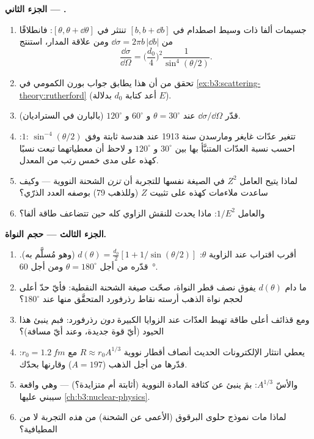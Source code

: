 \begin{problem}
\medskip\noindent\textbf{الجزء الثاني --- .}
\begin{enumerate}[resume]
  \item جسيمات ألفا ذات وسيط اصطدام في $[b, b + \dd b]$ تنتثر
        في $[\theta, \theta + \dd\theta]$: فانطلاقًا من $\dd\sigma =
        2\pi b\,|\dd b|$ ومن علاقة المدار، استنتج
        \[
        \frac{\dd\sigma}{\dd\Omega} =
        \Big(\frac{d_0}{4}\Big)^2\frac{1}{\sin^4(\theta/2)} .
        \]
  \item تحقق من أن هذا يطابق جواب بورن الكمومي في
        \cref{ex:b3:scattering-theory:rutherford} (أعد كتابة $d_0$
        بدلالة $E$).
  \item قدّر $\dd\sigma/\dd\Omega$ عند $\theta = 30^\circ$ و
        $60^\circ$ و $120^\circ$ (بالبارن في الستراديان).
  \item تتغير عدّات غايغر ومارسدن سنة 1913 عند هندسة ثابتة
        وفق $1{:}\,\sin^{-4}(\theta/2)$: احسب نسبة العدّات
        المتنبَّأ بها بين $30^\circ$ و $120^\circ$ و
        لاحظ أن معطياتهما تبعت نسبًا كهذه على مدى خمس رتب
        من المعدل.
  \item لماذا يتيح العامل $Z^2$ في الصيغة نفسها للتجربة أن
        \emph{تزن} الشحنة النووية --- وكيف ساعدت ملاءمات كهذه
        على تثبيت $Z$ (وللذهب 79) بوصفه العدد الذرّي؟
  \item والعامل $1/E^2$: ماذا يحدث للنقش الزاوي كله
        حين تتضاعف طاقة ألفا؟
\end{enumerate}

\medskip\noindent\textbf{الجزء الثالث --- حجم النواة.}
\begin{enumerate}[resume]
  \item أقرب اقتراب عند الزاوية $\theta$: $d(\theta) =
        \tfrac{d_0}2[1 + 1/\sin(\theta/2)]$ (وهو مُسلَّم به). قدّره
        من أجل $\theta = 180^\circ$ ومن أجل \qty{60}{\degree}.
  \item ما دام $d(\theta)$ يفوق نصف قطر النواة، صحّت
        صيغة الشحنة النقطية: فأيّ حدّ أعلى لحجم نواة
        الذهب أرسته نقاط رذرفورد المتحقَّق منها عند $180^\circ$؟
  \item ومع قذائف أعلى طاقة تهبط العدّات عند الزوايا الكبيرة
        \emph{دون} رذرفورد: فبم ينبئ هذا الحيود
        (أيّ قوة جديدة، وعند أيّ مسافة)؟
  \item يعطي انتثار الإلكترونات الحديث أنصاف أقطار نووية $R
        \approx r_0A^{1/3}$ مع $r_0 = \qty{1.2}{fm}$: قدّرها
        من أجل الذهب ($A = 197$) وقارنها بحدّك.
  \item والأسّ $A^{1/3}$: بمَ ينبئ عن كثافة المادة النووية
        (أثابتة أم متزايدة؟) --- وهي واقعة سيبني عليها
        \cref{ch:b3:nuclear-physics}.
  \item لماذا مات نموذج حلوى البرقوق (الأعمى عن الشحنة) من
        \emph{هذه} التجربة لا من المطيافية؟
\end{enumerate}


\end{problem}
